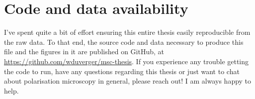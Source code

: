\chapter{Code and data availability}

I've spent quite a bit of effort ensuring this entire thesis easily reproducible from the raw data. To that end, the source code and data necessary to produce this file and the figures in it are published on GitHub, at \url{https://github.com/wduverger/msc-thesis}.
If you experience any trouble getting the code to run, have any questions regarding this thesis or just want to chat about polarisation microscopy in general, please reach out! I am always happy to help.